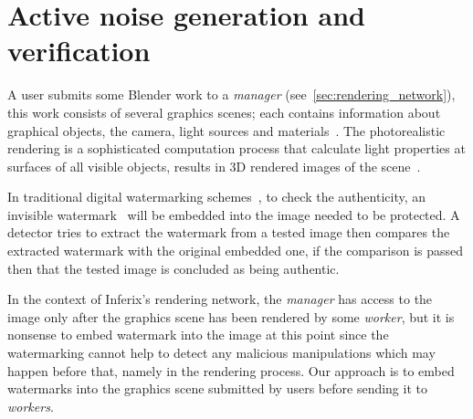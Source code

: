 
\section[Active noise generation and verification]{Active noise generation and verification}
A user submits some Blender work to a \emph{manager} (see~\autoref{sec:rendering_network}), this work consists of several graphics scenes; each contains information about graphical objects, the camera, light sources and materials~\cite{Blender}. The photorealistic rendering is a sophisticated computation process that calculate light properties at surfaces of all visible objects, results in 3D rendered images of the scene~\cite{Hughes2014}.

In traditional digital watermarking schemes~\cite{Cox2008,Cox1997,Cox1999}, to check the authenticity, an invisible watermark~\cite{Yeung1997,Craver1997,Wu1998} will be embedded into the image needed to be protected. A detector tries to extract the watermark from a tested image then compares the extracted watermark with the original embedded one, if the comparison is passed then that the tested image is concluded as being authentic.

In the context of Inferix's rendering network, the \emph{manager} has access to the image only after the graphics scene has been rendered by some \emph{worker}, but it is nonsense to embed watermark into the image at this point since the watermarking cannot help to detect any malicious manipulations which may happen before that, namely in the rendering process. Our approach is to embed watermarks into the graphics scene submitted by users before sending it to \emph{workers}.




